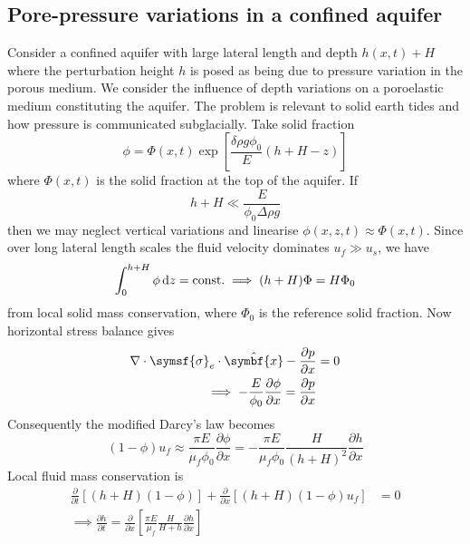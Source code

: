\documentclass{jknotes}
\begin{document}
\subsection{Pore-pressure variations in a confined aquifer}
Consider a confined aquifer with large lateral length and depth $h(x,t) + H$
where the perturbation height $h$ is posed as being due to pressure variation
in the porous medium.  We consider the influence of depth variations on a
poroelastic medium constituting the aquifer. The problem is relevant to solid
earth tides and how pressure is communicated subglacially. Take solid fraction
\begin{equation}
	\phi = \Phi(x,t) \exp \left[ \frac{\delta \rho g \phi_0}{E} (h+H-z)\right]
\end{equation}
where $\Phi(x,t)$ is the solid fraction at the top of the aquifer. If
\begin{equation}
	h + H \ll \frac{E}{\phi_0 \Delta \rho g}
\end{equation}
then we may neglect vertical variations and linearise $\phi(x,z,t) \approx
\Phi(x,t)$. Since over long lateral length scales the fluid velocity
dominates $u_f \gg u_s$, we have
\begin{equation}
	\int_0^{h+H} \phi \, \diffd z = \text{const.} \implies (h+H)\Phi = H\Phi_0
\end{equation}
from local solid mass conservation, where $\Phi_0$ is the reference solid
fraction. Now horizontal stress balance gives
\begin{align}
	\nabla \cdot \symsf{\sigma}_e \cdot \hat{\symbf{x}} - \frac{\partial
	p}{\partial x} &= 0 \\
	\implies -\frac{E}{\phi_0}\frac{\partial \phi}{\partial x} = \frac{\partial
	p}{\partial x}
\end{align}
Consequently the modified Darcy's law becomes
\begin{equation}
	(1-\phi)u_f \approx \frac{\pi E}{\mu_f \phi_0} \frac{\partial
	\phi}{\partial x} = -\frac{\pi E}{\mu_f \phi_0} \frac{H}{(h+H)^2}
	\frac{\partial h}{\partial x}
\end{equation}
Local fluid mass conservation is
\begin{align}
	\frac{\partial}{\partial t} \left[(h+H)(1-\phi)\right] +
	\frac{\partial}{\partial x} \left[ (h+H)(1-\phi)u_f\right] &= 0 \\
	\implies \frac{\partial h}{\partial t} = \frac{\partial}{\partial x}
	\left[\frac{\pi E}{\mu_f} \frac{H}{H+h}\frac{\partial h}{\partial x}
	\right]
\end{align}
\end{document}
